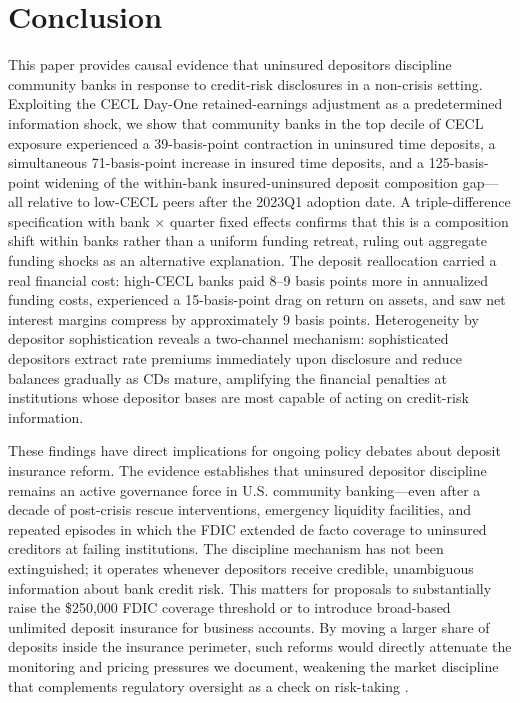 
\section{Conclusion}
\label{sec:conclusion}

This paper provides causal evidence that uninsured depositors discipline
community banks in response to credit-risk disclosures in a non-crisis setting.
Exploiting the CECL Day-One retained-earnings adjustment as a predetermined
information shock, we show that community banks in the top decile of CECL
exposure experienced a 39-basis-point contraction in uninsured time deposits,
a simultaneous 71-basis-point increase in insured time deposits, and a
125-basis-point widening of the within-bank insured-uninsured deposit composition
gap---all relative to low-CECL peers after the 2023Q1 adoption date.  A
triple-difference specification with bank $\times$ quarter fixed effects confirms
that this is a composition shift within banks rather than a uniform funding
retreat, ruling out aggregate funding shocks as an alternative explanation.
The deposit reallocation carried a real financial cost: high-CECL banks paid
8--9 basis points more in annualized funding costs, experienced a 15-basis-point
drag on return on assets, and saw net interest margins compress by approximately
9 basis points.  Heterogeneity by depositor sophistication reveals a two-channel
mechanism: sophisticated depositors extract rate premiums immediately upon
disclosure and reduce balances gradually as CDs mature, amplifying the financial
penalties at institutions whose depositor bases are most capable of acting on
credit-risk information.

These findings have direct implications for ongoing policy debates about deposit
insurance reform.  The evidence establishes that uninsured depositor discipline
remains an active governance force in U.S. community banking---even after a
decade of post-crisis rescue interventions, emergency liquidity facilities, and
repeated episodes in which the FDIC extended de facto coverage to uninsured
creditors at failing institutions.  The discipline mechanism has not been
extinguished; it operates whenever depositors receive credible, unambiguous
information about bank credit risk.  This matters for proposals to substantially
raise the \$250{,}000 FDIC coverage threshold or to introduce broad-based
unlimited deposit insurance for business accounts.  By moving a larger share of
deposits inside the insurance perimeter, such reforms would directly attenuate
the monitoring and pricing pressures we document, weakening the market
discipline that complements regulatory oversight as a check on risk-taking
\citep{nier2006market, demirgucc2004market, flannery2019market}.

